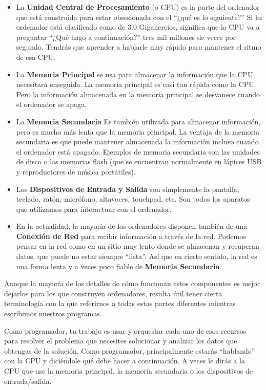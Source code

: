 \begin{itemize}

\item La {\bf Unidad Central de Procesamiento} (o CPU) es
la parte del ordenador que está construida para estar obsesionada
con el ``¿qué es lo siguiente?'' Si tu ordenador está clasificado
como de 3.0 Gigahercios, significa que la CPU va a preguntar ``¿Qué hago a continuación?''
tres mil millones de veces por segundo. Tendrás que aprender a hablarle muy
rápido para mantener el ritmo de esa CPU.

\item La {\bf Memoria Principal} se usa para almacenar la información
que la CPU necesitará enseguida. La memoria principal es casi
tan rápida como la CPU. Pero la información almacenada en la memoria
principal se desvanece cuando el ordenador se apaga.

\item La {\bf Memoria Secundaria} Es también utilizada para almacenar
información, pero es mucho más lenta que la memoria principal.
La ventaja de la memoria secundaria es que puede mantener
almacenada la información incluso cuando el ordenador está apagado.
Ejemplos de memoria secundaria son las unidades de disco o las
memorias flash (que se encuentran normalmente en lápices USB y
reproductores de música portátiles).

\item Los {\bf Dispositivos de Entrada y Salida} son simplemente
la pantalla, teclado, ratón, micrófono, altavoces, touchpad, etc.
Son todos los aparatos que utilizamos para interactuar con el ordenador.

\item En la actualidad, la mayoría de los ordenadores disponen también de una
{\bf Conexión de Red} para recibir información a través de la red.
Podemos pensar en la red como en un sitio muy lento donde se almacenan
y recuperan datos, que puede no estar siempre ``lista''. Así que en cierto sentido,
la red es una forma lenta y a veces poco fiable de
{\bf Memoria Secundaria}.

\end{itemize}

Aunque la mayoría de los detalles de cómo funcionan estos componentes es mejor
dejarlos para los que construyen ordenadores, resulta útil tener cierta terminología
con la que referirnos a todas estas partes diferentes mientras escribimos nuestros programas.

Como programador, tu trabajo es usar y orquestar cada uno de esos
recursos para resolver el problema que necesites solucionar
y analizar los datos que obtengas de la solución. Como programador, principalmente
estarás ``hablando'' con la CPU y diciéndole qué debe hacer a continuación.
A veces le dirás a la CPU que use la memoria principal,
la memoria secundaria o los dispositivos de entrada/salida.

